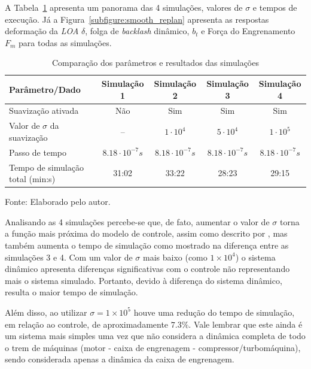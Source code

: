 A Tabela~\ref{tab:smooth_replan} apresenta um panorama das 4 simulações, valores de $\sigma$ e tempos de execução. Já a Figura~\ref{subfigure:smooth_replan} apresenta as respostas deformação da \textit{LOA} $\delta$, folga de \textit{backlash} dinâmico, $b_t$ e Força do Engrenamento $F_m$ para todas as simulações.
\begin{table}[H]
	\centering
	\begin{threeparttable}
		\caption{Comparação dos parâmetros e resultados das simulações}
		\label{tab:smooth_replan}
		
		\begin{tabular}{lcccc}
			\hline
			\textbf{Parâmetro/Dado} & \textbf{Simulação 1} & \textbf{Simulação 2} & \textbf{Simulação 3} & \textbf{Simulação 4} \\
			\hline
			Suavização ativada & Não & Sim & Sim & Sim\\
			Valor de $\sigma$ da suavização & -- & $1\cdot10^4$ & $5\cdot10^4$ & $1\cdot10^5$\\
			Passo de tempo & $8.18\cdot10^{-7} s$ & $8.18\cdot10^{-7} s$ & $8.18\cdot10^{-7} s$ & $8.18\cdot10^{-7} s $ \\
			Tempo de simulação total (min:s)& 31:02 & 33:22 & 28:23 & 29:15\\
			\hline
		\end{tabular}
		
		\begin{tablenotes}[para, flushleft]
			\small
			\item Fonte: Elaborado pelo autor.
		\end{tablenotes}
		
	\end{threeparttable}
\end{table}

Analisando as 4 simulações percebe-se que, de fato, aumentar o valor de $\sigma$ torna a função mais próxima do modelo de controle, assim como descrito por , mas também aumenta o tempo de simulação como mostrado na diferença entre as simulações 3 e 4. Com um valor de $\sigma$ mais baixo (como $1\times10^4$) o sistema dinâmico apresenta diferenças significativas com o controle não representando mais o sistema simulado. Portanto, devido à diferença do sistema dinâmico, resulta o maior tempo de simulação.

Além disso, ao utilizar $\sigma=1\times10^5$ houve uma redução do tempo de simulação, em relação ao controle, de aproximadamente $7.3\%$. Vale lembrar que este ainda é um sistema mais simples uma vez que não considera a dinâmica completa de todo o trem de máquinas (motor - caixa de engrenagem - compressor/turbomáquina), sendo considerada apenas a dinâmica da caixa de engrenagem.

